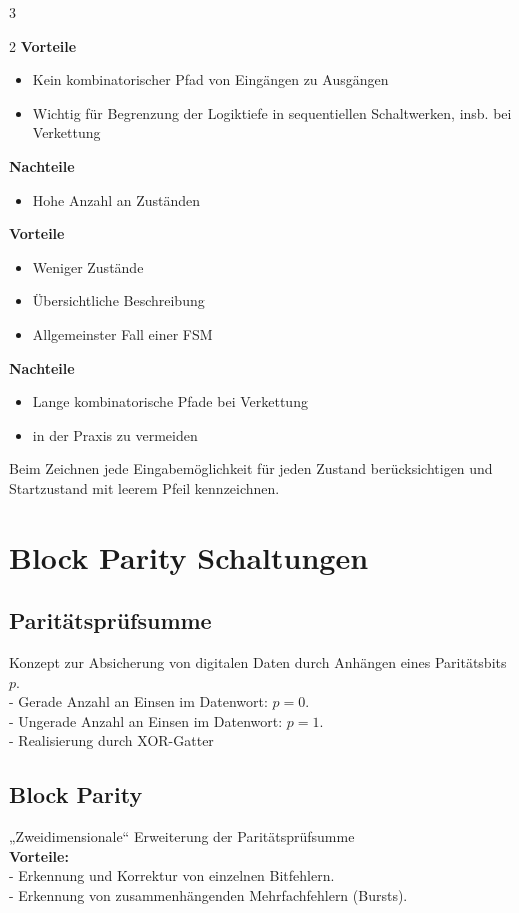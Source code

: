\documentclass[6pt,a4paper]{scrartcl}
\begin{document}
\begin{multicols*}{3}
\begin{multicols}{2}
\noindent\textbf{Vorteile}
\begin{itemize} \itemsep0pt
 \item Kein kombinatorischer Pfad von Eingängen zu Ausgängen
 \item Wichtig für Begrenzung der Logiktiefe in sequentiellen Schaltwerken, insb. bei Verkettung
\end{itemize}
\textbf{Nachteile}
\begin{itemize} \itemsep0pt
 \item Hohe Anzahl an Zuständen
\end{itemize}
\pagebreak
\textbf{Vorteile}
\begin{itemize} \itemsep0pt
 \item Weniger Zustände
 \item Übersichtliche Beschreibung
 \item Allgemeinster Fall einer FSM
\end{itemize}
\textbf{Nachteile}
\begin{itemize} \itemsep0pt
 \item Lange kombinatorische Pfade bei Verkettung
 \item in der Praxis zu vermeiden
\end{itemize}
\end{multicols}
Beim Zeichnen jede Eingabemöglichkeit für jeden Zustand berücksichtigen und Startzustand mit leerem Pfeil kennzeichnen.

\section{Block Parity Schaltungen}
\subsection{Paritätsprüfsumme}
Konzept zur Absicherung von digitalen Daten durch Anhängen eines Paritätsbits $p$.\\
- Gerade Anzahl an Einsen im Datenwort: $p = 0$.\\
- Ungerade Anzahl an Einsen im Datenwort: $p = 1$.\\
- Realisierung durch XOR-Gatter
\subsection{Block Parity}
„Zweidimensionale“ Erweiterung der Paritätsprüfsumme\\
\textbf{Vorteile:}\\
 - Erkennung und Korrektur von einzelnen Bitfehlern.\\
 - Erkennung von zusammenhängenden Mehrfachfehlern (Bursts).

\end{multicols*}
\end{document}

